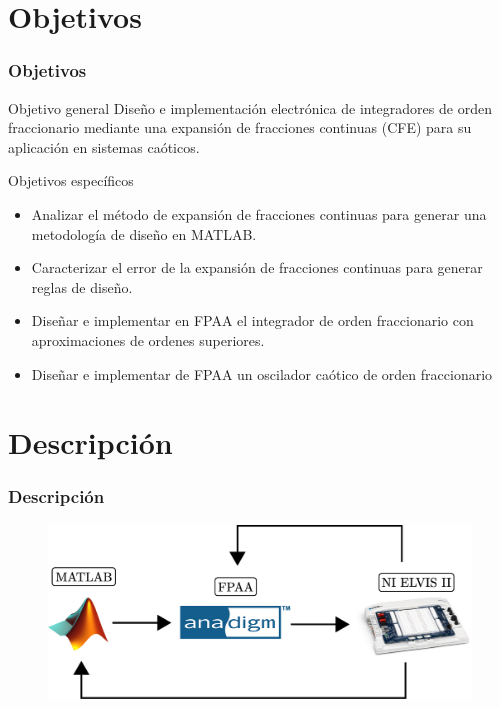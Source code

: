 \documentclass[10pt]{beamer}
\begin{document}
	\section{Objetivos}
	\begin{frame}
		\frametitle{Objetivos}
		\begin{block}{Objetivo general}
		\justifying
			Diseño e implementación electrónica de integradores de orden fraccionario mediante una expansión de fracciones continuas (CFE) para su aplicación en sistemas caóticos.
		\end{block}
		
		\begin{block}{Objetivos específicos}
			\begin{itemize}
			\justifying
				\item Analizar el método de expansión de fracciones continuas para generar una metodología de diseño en MATLAB.
				\item Caracterizar el error de la expansión de fracciones continuas para generar reglas de diseño.
				\item Diseñar e implementar en FPAA el integrador de orden fraccionario con aproximaciones de ordenes superiores.
				\item Diseñar e implementar de FPAA un oscilador caótico de orden fraccionario	
			\end{itemize}
		\end{block}
	\end{frame}
	
	
	
	\section{Descripción}
	\begin{frame}
		\frametitle{Descripción}
		\begin{figure}[hbtp]
			\centering
			\includegraphics[width = 12cm]{descripcion.eps}
		\end{figure}
	\end{frame}
	
\end{document}
